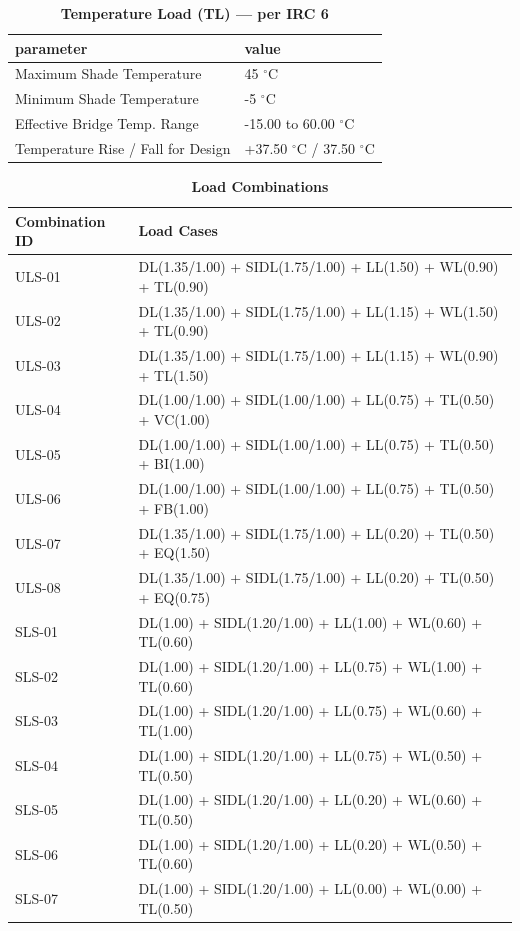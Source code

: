 \documentclass[12pt,a4paper]{report}
\numberwithin{table}{chapter}
\numberwithin{figure}{chapter}
\begin{document}
\vspace{1em}
\begin{longtable}{|L{5.5cm}|p{10.0cm}|}
\caption{\textbf{Temperature Load (TL) --- per IRC 6}}
\hline
\textbf{parameter} & \textbf{value} \\
\hline
\textnormal{Maximum Shade Temperature} & 45 $^\circ$C \\[6pt]
\hline
\textnormal{Minimum Shade Temperature} & -5 $^\circ$C \\[6pt]
\hline
\textnormal{Effective Bridge Temp. Range} & -15.00 to 60.00 $^\circ$C \\[6pt]
\hline
\textnormal{Temperature Rise / Fall for Design} & +37.50 $^\circ$C / \textminus{}37.50 $^\circ$C \\[6pt]
\hline
\end{longtable}

\vspace{1em}
\begin{longtable}{|C{4.0cm}|p{11.5cm}|}
\caption{\textbf{Load Combinations}}
\hline
\textbf{Combination ID} & \textbf{Load Cases} \\[6pt]
\hline
ULS-01 & DL(1.35/1.00) + SIDL(1.75/1.00) + LL(1.50) + WL(0.90) + TL(0.90) \\[6pt]
\hline
ULS-02 & DL(1.35/1.00) + SIDL(1.75/1.00) + LL(1.15) + WL(1.50) + TL(0.90) \\[6pt]
\hline
ULS-03 & DL(1.35/1.00) + SIDL(1.75/1.00) + LL(1.15) + WL(0.90) + TL(1.50) \\[6pt]
\hline
ULS-04 & DL(1.00/1.00) + SIDL(1.00/1.00) + LL(0.75) + TL(0.50) + VC(1.00) \\[6pt]
\hline
ULS-05 & DL(1.00/1.00) + SIDL(1.00/1.00) + LL(0.75) + TL(0.50) + BI(1.00) \\[6pt]
\hline
ULS-06 & DL(1.00/1.00) + SIDL(1.00/1.00) + LL(0.75) + TL(0.50) + FB(1.00) \\[6pt]
\hline
ULS-07 & DL(1.35/1.00) + SIDL(1.75/1.00) + LL(0.20) + TL(0.50) + EQ(1.50) \\[6pt]
\hline
ULS-08 & DL(1.35/1.00) + SIDL(1.75/1.00) + LL(0.20) + TL(0.50) + EQ(0.75) \\[6pt]
\hline
SLS-01 & DL(1.00) + SIDL(1.20/1.00) + LL(1.00) + WL(0.60) + TL(0.60) \\[6pt]
\hline
SLS-02 & DL(1.00) + SIDL(1.20/1.00) + LL(0.75) + WL(1.00) + TL(0.60) \\[6pt]
\hline
SLS-03 & DL(1.00) + SIDL(1.20/1.00) + LL(0.75) + WL(0.60) + TL(1.00) \\[6pt]
\hline
SLS-04 & DL(1.00) + SIDL(1.20/1.00) + LL(0.75) + WL(0.50) + TL(0.50) \\[6pt]
\hline
SLS-05 & DL(1.00) + SIDL(1.20/1.00) + LL(0.20) + WL(0.60) + TL(0.50) \\[6pt]
\hline
SLS-06 & DL(1.00) + SIDL(1.20/1.00) + LL(0.20) + WL(0.50) + TL(0.60) \\[6pt]
\hline
SLS-07 & DL(1.00) + SIDL(1.20/1.00) + LL(0.00) + WL(0.00) + TL(0.50) \\[6pt]
\hline
\end{longtable}
\end{document}
